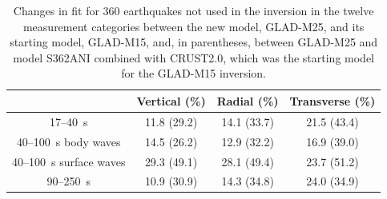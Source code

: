 \documentclass[extra,mreferee]{gji}
\begin{document}
\begin{table}
  \centering
  \begin{tabular}{|c|c|c|c|}
  \hline
  ~          &  Vertical (\%) & Radial (\%) &  Transverse (\%) \\
  \hline
  17--40~s                &          11.8 (29.2) &       14.1 (33.7) &       21.5 (43.4) \\
  40--100~s body waves    &          14.5 (26.2) &       12.9 (32.2)  &       16.9 (39.0) \\
  40--100~s surface waves &          29.3 (49.1) &       28.1 (49.4) &       23.7 (51.2) \\
  90--250~s               &          10.9 (30.9) &       14.3 (34.8)  &       24.0 (34.9) \\
  \hline
  \end{tabular}\\
  \caption{\small{Changes in fit for 360 earthquakes not used in the inversion in the twelve measurement categories
between the new model, GLAD-M25, and its starting model, GLAD-M15, and, in parentheses, between GLAD-M25 and model S362ANI combined with CRUST2.0, which was the starting model for the GLAD-M15 inversion.}}
  \label{table:misfit_reduction_M15_M25_360}
\end{table}

\end{document}
